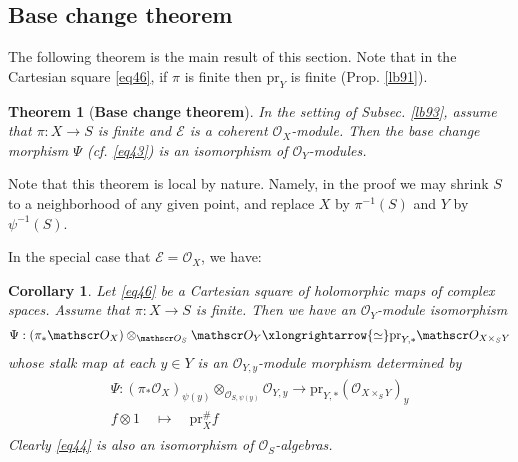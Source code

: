 \documentclass[12pt,b5paper,notitlepage]{report}
\theoremstyle{definition}
\theoremstyle{plain}
\newtheorem{thm}[df]{Theorem}
\newtheorem{co}[df]{Corollary}
\newcommand{\scr}{\mathscr}
\newcommand{\Cbb}{\mathbb C}
\newcommand{\pr}{\mathrm {pr}}
\numberwithin{equation}{section}
\begin{document}
\subsection{Base change theorem}




The following theorem is the main result of this section. Note that in the Cartesian square \eqref{eq46}, if $\pi$ is finite then $\pr_Y$ is finite (Prop. \ref{lb91}).



\begin{thm}[\textbf{Base change theorem}]\label{lb94}
In the setting of Subsec. \ref{lb93}, assume that $\pi:X\rightarrow S$ is finite and $\scr E$ is a coherent $\scr O_X$-module. Then the base change morphism $\Psi$ (cf. \eqref{eq43}) is an isomorphism of $\scr O_Y$-modules.
\end{thm}


Note that this theorem is local by nature. Namely, in the proof we may shrink $S$ to a neighborhood of any given point, and replace $X$ by $\pi^{-1}(S)$ and $Y$ by $\psi^{-1}(S)$. 


In the special case that $\scr E=\scr O_X$, we have:

\begin{co}\label{lb95}
Let \eqref{eq46} be a Cartesian square of holomorphic maps of complex spaces. Assume that $\pi:X\rightarrow S$ is finite. Then we have an $\scr O_Y$-module isomorphism
\begin{align}\label{eq44}
\Psi:(\pi_*\scr O_X)\otimes_{\scr O_S}\scr O_Y\xlongrightarrow{\simeq} \pr_{Y,*}\scr O_{X\times_SY}
\end{align}
whose stalk map at each $y\in Y$ is an $\scr O_{Y,y}$-module morphism determined by
\begin{gather}\label{eq45}
\begin{gathered}
\Psi:(\pi_*\scr O_X)_{\psi(y)}\otimes_{\scr O_{S,\psi(y)}}\scr O_{Y,y}\longrightarrow \pr_{Y,*}(\scr O_{X\times_SY})_y\\[0.8ex]
f\otimes 1\quad\mapsto\quad \pr_X^\#f
\end{gathered}
\end{gather}
Clearly \eqref{eq44} is also an isomorphism of $\scr O_S$-algebras.
\end{co}
\end{document}
